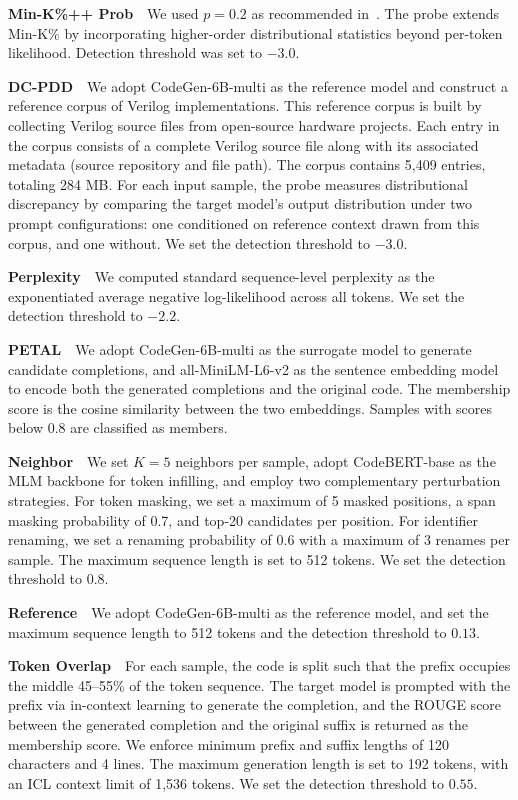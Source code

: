 \textbf{Min-K\%++ Prob}\ \ We used $p=0.2$ as recommended in~\cite{zhang2025min}. The probe extends Min-K\% by incorporating higher-order distributional statistics beyond per-token likelihood. Detection threshold was set to $-3.0$.

\textbf{DC-PDD}\ \ We adopt CodeGen-6B-multi as the reference model and construct a reference corpus of Verilog implementations. This reference corpus is built by collecting Verilog source files from open-source hardware projects. Each entry in the corpus consists of a complete Verilog source file along with its associated metadata (source repository and file path). The corpus contains 5,409 entries, totaling 284 MB. For each input sample, the probe measures distributional discrepancy by comparing the target model's output distribution under two prompt configurations: one conditioned on reference context drawn from this corpus, and one without. We set the detection threshold to $-3.0$.

\textbf{Perplexity}\ \ We computed standard sequence-level perplexity as the exponentiated average negative log-likelihood across all tokens. We set the detection threshold to $-2.2$.

\textbf{PETAL}\ \ We adopt CodeGen-6B-multi as the surrogate model to generate candidate completions, and all-MiniLM-L6-v2 as the sentence embedding model to encode both the generated completions and the original code. The membership score is the cosine similarity between the two embeddings. Samples with scores below $0.8$ are classified as members.

\textbf{Neighbor}\ \ We set $K=5$ neighbors per sample, adopt CodeBERT-base as the MLM backbone for token infilling, and employ two complementary perturbation strategies. For token masking, we set a maximum of 5 masked positions, a span masking probability of 0.7, and top-20 candidates per position. For identifier renaming, we set a renaming probability of 0.6 with a maximum of 3 renames per sample. The maximum sequence length is set to 512 tokens. We set the detection threshold to $0.8$.

\textbf{Reference}\ \ We adopt CodeGen-6B-multi as the reference model, and set the maximum sequence length to 512 tokens and the detection threshold to $0.13$.

\textbf{Token Overlap}\ \ For each sample, the code is split such that the prefix occupies the middle 45--55\% of the token sequence. The target model is prompted with the prefix via in-context learning to generate the completion, and the ROUGE score between the generated completion and the original suffix is returned as the membership score. We enforce minimum prefix and suffix lengths of 120 characters and 4 lines. The maximum generation length is set to 192 tokens, with an ICL context limit of 1,536 tokens. We set the detection threshold to $0.55$.

